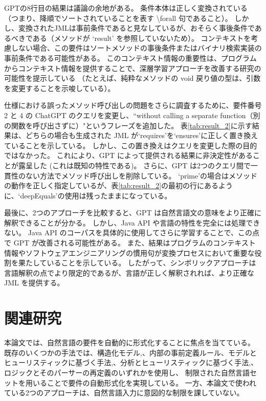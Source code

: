 \documentclass[uplatex, twocolumn, 10pt]{jsarticle} %
\begin{document}
GPTの8行目の結果は議論の余地がある。
条件本体は正しく変換されている （つまり、降順でソートされていることを表す \textbackslash forall 句であること）。
しかし、変換されたJMLは事前条件であると見なしているが、おそらく事後条件であるべきである（メソッドが `result' を参照していないため）。
コンテキストを考慮しない場合、この要件はソートメソッドの事後条件またはバイナリ検索実装の事前条件である可能性がある。
このコンテキスト情報の重要性は、プログラムからコンテキスト情報を提供することで、深層学習アプローチを改善する研究の可能性を提示している
（たとえば、純粋なメソッドの void 戻り値の型は、引数を変更することを示唆している）。

仕様における誤ったメソッド呼び出しの問題をさらに調査するために、要件番号 2 と 4 の ChatGPT のクエリを変更し、``without calling a separate function（別の関数を呼び出さずに）"というフレーズを追加した。
表\ref{tab:result_2}に示す結果は、どちらの場合も生成された JML が`requires'を`ensures'に正しく置き換えていることを示している。
しかし、この置き換えはクエリを変更した際の目的ではなかった。
これにより、GPT によって提供される結果に非決定性があることが露呈した (これは既知の特性である)。
さらに、GPT は2つのクエリ間で一貫性のない方法でメソッド呼び出しを削除している。
`prime'の場合はメソッドの動作を正しく指定しているが、表\ref{tab:result_2}の最初の行にあるように、`deepEquals'の使用は残ったままになっている。

最後に、2つのアプローチを比較すると、GPT は自然言語文の意味をより正確に解釈できることが分かる。
しかし、Java API や言語の特性を完全には処理できない。
Java API のコーパスを具体的に使用してさらに学習することで、この点で GPT が改善される可能性がある。
また、結果はプログラムのコンテキスト情報やソフトウェアエンジニアリングの慣用句が変換プロセスにおいて重要な役割を果たしていることを示している。
したがって、シンボリックアプローチは言語解釈の点でより限定的であるが、言語が正しく解釈されれば、より正確な JML を提供する。

\section{関連研究}
\label{sec:related_work}
本論文では、自然言語の要件を自動的に形式化することに焦点を当てている。
既存のいくつかの手法では、構造化モデル\cite{8},\cite{9}、内部の事前定義ルール\cite{10}、モデルとヒューリスティックに基づく手法\cite{11},\cite{12}、分析とヒューリスティックに基づく手法\cite{13},\cite{14}、ロジックとそのパーサーの再定義\cite{15}のいずれかを使用し、
制限された自然言語セットを用いることで要件の自動形式化を実現している。
一方、本論文で使われている2つのアプローチは、自然言語入力に意図的な制限を課していない。
\end{document}

